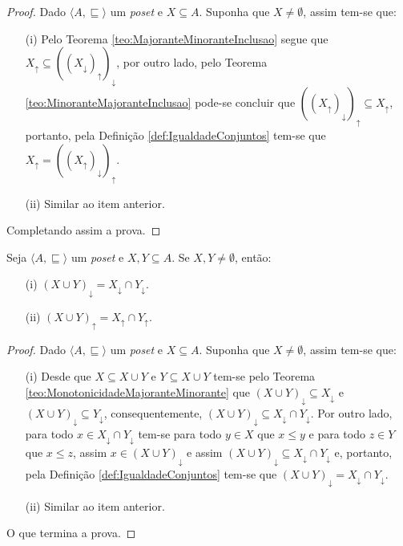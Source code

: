 \begin{proof}
	Dado $\langle A, \sqsubseteq \rangle$ um \textit{poset} e $X \subseteq A$. Suponha que $X \neq \emptyset$, assim tem-se que:
	\begin{itemize}
		\item[(i)] Pelo Teorema \ref{teo:MajoranteMinoranteInclusao} segue que $X_\uparrow \subseteq ((X_\downarrow)_\uparrow)_\downarrow$, por outro lado, pelo Teorema \ref{teo:MinoranteMajoranteInclusao} pode-se concluir que $((X_\uparrow)_\downarrow)_\uparrow \subseteq X_\uparrow$, portanto, pela Definição \ref{def:IgualdadeConjuntos} tem-se que  $X_\uparrow = ((X_\uparrow)_\downarrow)_\uparrow$.
		\item[(ii)] Similar ao item anterior.
	\end{itemize}
	Completando assim a prova.
\end{proof}

\begin{teorema}\label{teo:RotacaoMajoranteMinorante}
	Seja $\langle A, \sqsubseteq \rangle$ um \textit{poset} e $X, Y \subseteq A$. Se $X, Y \neq \emptyset$, então:
	\begin{itemize}
		\item[(i)]  $(X \cup Y)_\downarrow = X_\downarrow \cap Y_\downarrow$.
		\item[(ii)] $(X \cup Y)_\uparrow = X_\uparrow \cap Y_\uparrow$.
	\end{itemize}
\end{teorema}

\begin{proof}
	Dado $\langle A, \sqsubseteq \rangle$ um \textit{poset} e $X \subseteq A$. Suponha que $X \neq \emptyset$, assim tem-se que:
	\begin{itemize}
		\item[(i)] Desde que $X \subseteq X \cup Y$ e  $Y \subseteq X \cup Y$ tem-se pelo Teorema \ref{teo:MonotonicidadeMajoranteMinorante} que $(X \cup Y)_\downarrow \subseteq X_\downarrow$ e  $(X \cup Y)_\downarrow \subseteq Y_\downarrow $, consequentemente, $(X \cup Y)_\downarrow \subseteq X_\downarrow \cap Y_\downarrow$. Por outro lado, para todo $x \in X_\downarrow \cap Y_\downarrow$ tem-se para todo $y \in X$ que $x \leq y$ e para todo $z \in Y$ que $x \leq z$, assim $x \in (X \cup Y)_\downarrow$ e assim $(X \cup Y)_\downarrow \subseteq X_\downarrow \cap Y_\downarrow$ e, portanto, pela Definição \ref{def:IgualdadeConjuntos}  tem-se que $(X \cup Y)_\downarrow = X_\downarrow \cap Y_\downarrow$.
		\item[(ii)] Similar ao item anterior.
	\end{itemize}
	O que termina a prova.
\end{proof}

